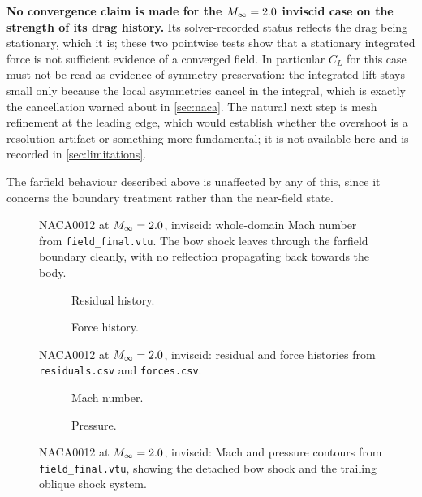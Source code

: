 \textbf{No convergence claim is made for the $M_\infty=2.0$ inviscid case on the strength of
its drag history.} Its solver-recorded status reflects the drag being stationary, which it
is; these two pointwise tests show that a stationary integrated force is not sufficient
evidence of a converged field. In particular $C_L$ for this case must not be read as
evidence of symmetry preservation: the integrated lift stays small only because the local
asymmetries cancel in the integral, which is exactly the cancellation warned about in
\cref{sec:naca}. The natural next step is mesh refinement at the leading edge, which would
establish whether the overshoot is a resolution artifact or something more fundamental; it
is not available here and is recorded in \cref{sec:limitations}.

The farfield behaviour described above is unaffected by any of this, since it concerns
the boundary treatment rather than the near-field state.

\begin{figure}[htbp]
  \centering
  \caption{NACA0012 at $M_\infty=2.0$, inviscid: whole-domain Mach number from
  \texttt{field\_final.vtu}. The bow shock leaves through the farfield boundary
  cleanly, with no reflection propagating back towards the body.}
  \label{fig:naca200inv-farfield}
\end{figure}

\begin{figure}[htbp]
  \centering
  \begin{subfigure}{0.49\textwidth}\centering
    \caption{Residual history.}
  \end{subfigure}\hfill
  \begin{subfigure}{0.49\textwidth}\centering
    \caption{Force history.}
  \end{subfigure}
  \caption{NACA0012 at $M_\infty=2.0$, inviscid: residual and force histories from
  \texttt{residuals.csv} and \texttt{forces.csv}.}
  \label{fig:naca200inv-hist}
\end{figure}

\begin{figure}[htbp]
  \centering
  \begin{subfigure}{0.49\textwidth}\centering
    \caption{Mach number.}
  \end{subfigure}\hfill
  \begin{subfigure}{0.49\textwidth}\centering
    \caption{Pressure.}
  \end{subfigure}
  \caption{NACA0012 at $M_\infty=2.0$, inviscid: Mach and pressure contours from
  \texttt{field\_final.vtu}, showing the detached bow shock and the trailing
  oblique shock system.}
  \label{fig:naca200inv-field}
\end{figure}

